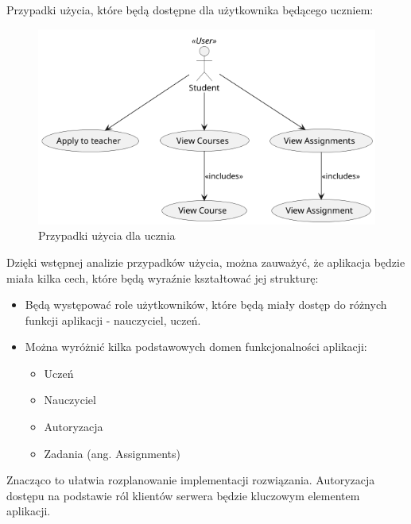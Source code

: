 Przypadki użycia, które będą dostępne dla użytkownika będącego uczniem:
\begin{figure}[H]
    \centering
    \clearpage
    \includegraphics[width=15cm,keepaspectratio]{rysunki/usecases/StudentUseCases.png}
    \caption{Przypadki użycia dla ucznia}
    \label{fig:usecases:student}
\end{figure}

Dzięki wstępnej analizie przypadków użycia, można zauważyć, że aplikacja będzie miała kilka cech, które będą wyraźnie kształtować jej strukturę:
\begin{itemize}
    \item Będą występować role użytkowników, które będą miały dostęp do różnych funkcji aplikacji - nauczyciel, uczeń.
    \item Można wyróżnić kilka podstawowych domen funkcjonalności aplikacji:
    \begin{itemize}
        \item Uczeń
        \item Nauczyciel
        \item Autoryzacja
        \item Zadania (ang. Assignments)
    \end{itemize}
\end{itemize}

Znacząco to ułatwia rozplanowanie implementacji rozwiązania.
Autoryzacja dostępu na podstawie ról klientów serwera będzie kluczowym elementem aplikacji.
\clearpage



